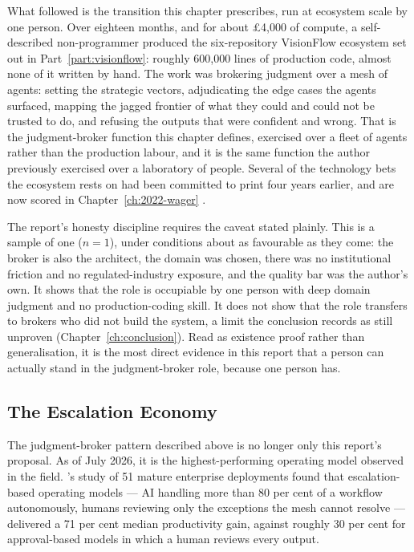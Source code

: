 What followed is the transition this chapter prescribes, run at ecosystem scale by one person. Over eighteen months, and for about \pounds4,000 of compute, a self-described non-programmer produced the six-repository VisionFlow ecosystem set out in Part~\ref{part:visionflow}: roughly 600,000 lines of production code, almost none of it written by hand. The work was brokering judgment over a mesh of agents: setting the strategic vectors, adjudicating the edge cases the agents surfaced, mapping the jagged frontier of what they could and could not be trusted to do, and refusing the outputs that were confident and wrong. That is the judgment-broker function this chapter defines, exercised over a fleet of agents rather than the production labour, and it is the same function the author previously exercised over a laboratory of people. Several of the technology bets the ecosystem rests on had been committed to print four years earlier, and are now scored in Chapter~\ref{ch:2022-wager} \parencite{OHare2022Convergence}.

The report's honesty discipline requires the caveat stated plainly. This is a sample of one ($n=1$), under conditions about as favourable as they come: the broker is also the architect, the domain was chosen, there was no institutional friction and no regulated-industry exposure, and the quality bar was the author's own. It shows that the role is occupiable by one person with deep domain judgment and no production-coding skill. It does not show that the role transfers to brokers who did not build the system, a limit the conclusion records as still unproven (Chapter~\ref{ch:conclusion}). Read as existence proof rather than generalisation, it is the most direct evidence in this report that a person can actually stand in the judgment-broker role, because one person has.

\subsection{The Escalation Economy}

The judgment-broker pattern described above is no longer only this report's proposal. As of July 2026, it is the highest-performing operating model observed in the field. \textcite{Pereira2026Playbook}'s study of 51 mature enterprise deployments found that escalation-based operating models --- AI handling more than 80 per cent of a workflow autonomously, humans reviewing only the exceptions the mesh cannot resolve --- delivered a 71 per cent median productivity gain, against roughly 30 per cent for approval-based models in which a human reviews every output.

